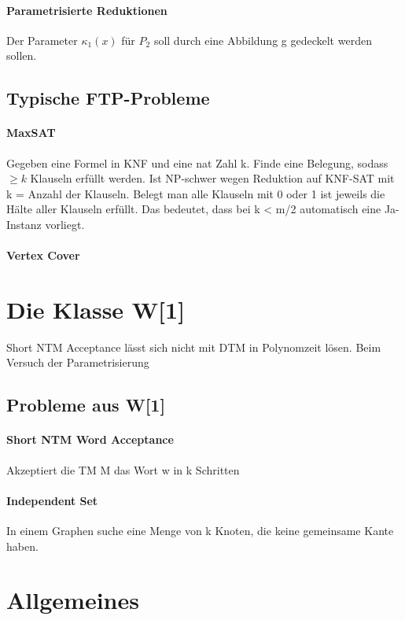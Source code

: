 \documentclass[ngerman]{scrartcl}
\begin{document}
\paragraph{Parametrisierte Reduktionen}  Der Parameter $ \kappa_1(x) $ für $ P_2 $ soll durch eine Abbildung g gedeckelt werden sollen.

\subsection{Typische FTP-Probleme}
\paragraph{MaxSAT} Gegeben eine Formel in KNF und eine nat Zahl k. Finde eine Belegung, sodass $ \geq k $ Klauseln erfüllt werden. Ist NP-schwer wegen Reduktion auf KNF-SAT mit k = Anzahl der Klauseln. Belegt man alle Klauseln mit 0 oder 1 ist jeweils die Hälte aller Klauseln erfüllt. Das bedeutet, dass bei k < m/2 automatisch eine Ja-Instanz vorliegt. 

\paragraph{Vertex Cover}

\section{Die Klasse W[1]}
Short NTM Acceptance lässt sich nicht mit DTM in Polynomzeit lösen. Beim Versuch der Parametrisierung

\subsection{Probleme aus W[1]}
\paragraph{Short NTM Word Acceptance} Akzeptiert die TM M das Wort w in k Schritten
\paragraph{Independent Set} In einem Graphen suche eine Menge von k Knoten, die keine gemeinsame Kante haben.  




%
%
%
%
\section{Allgemeines}
\end{document}
